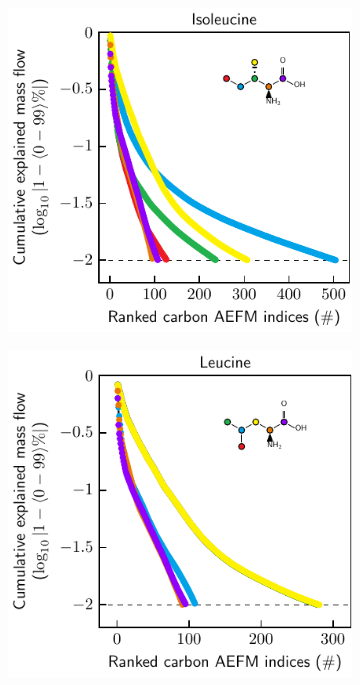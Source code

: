\documentclass[]{article}
\begin{document}
\begin{figure}
\begin{subfigure}[t]{0.247\textwidth}
    \end{subfigure}
    \begin{subfigure}[t]{0.247\textwidth}
        \caption{}
        \includegraphics[width=\textwidth]{subpanels/cumulative-source-met-20-log.pdf}\\
    \end{subfigure}
    \begin{subfigure}[t]{0.247\textwidth}
        \caption{}
        \includegraphics[width=\textwidth]{subpanels/cumulative-source-met-21-log.pdf}\\
    \end{subfigure}


\end{figure}
\end{document}
